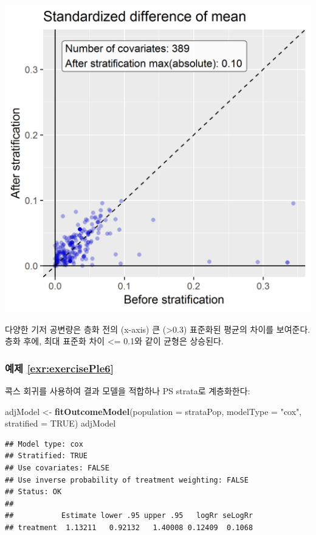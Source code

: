 \documentclass[11pt]{book}
\newenvironment{Shaded}{\begin{snugshade}}{\end{snugshade}}
\newcommand{\KeywordTok}[1]{\textcolor[rgb]{0.13,0.29,0.53}{\textbf{#1}}}
\newcommand{\DataTypeTok}[1]{\textcolor[rgb]{0.13,0.29,0.53}{#1}}
\newcommand{\StringTok}[1]{\textcolor[rgb]{0.31,0.60,0.02}{#1}}
\newcommand{\OtherTok}[1]{\textcolor[rgb]{0.56,0.35,0.01}{#1}}
\newcommand{\NormalTok}[1]{#1}
\theoremstyle{definition}
\theoremstyle{definition}
\theoremstyle{definition}
\theoremstyle{remark}
\begin{document}
\begin{center}\includegraphics[width=0.7\linewidth]{images/SuggestedAnswers/scatter} \end{center}

다양한 기저 공변량은 층화 전의 (x-axis) 큰 (\textgreater{}0.3) 표준화된
평균의 차이를 보여준다. 층화 후에, 최대 표준화 차이 \textless{}= 0.1와
같이 균형은 상승된다.

\subsubsection*{예제 \ref{exr:exercisePle6}}\label{-refexrexerciseple6}

콕스 회귀를 사용하여 결과 모델을 적합하나 PS strata로 계층화한다:

\begin{Shaded}
\begin{Highlighting}[]
\NormalTok{adjModel <-}\StringTok{ }\KeywordTok{fitOutcomeModel}\NormalTok{(}\DataTypeTok{population =}\NormalTok{ strataPop,}
                         \DataTypeTok{modelType =} \StringTok{"cox"}\NormalTok{,}
                         \DataTypeTok{stratified =} \OtherTok{TRUE}\NormalTok{)}
\NormalTok{adjModel}
\end{Highlighting}
\end{Shaded}

\begin{verbatim}
## Model type: cox
## Stratified: TRUE
## Use covariates: FALSE
## Use inverse probability of treatment weighting: FALSE
## Status: OK
## 
##           Estimate lower .95 upper .95   logRr seLogRr
## treatment  1.13211   0.92132   1.40008 0.12409  0.1068
\end{verbatim}
\end{document}
